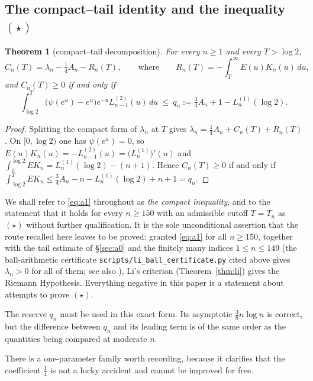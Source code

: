 \documentclass[11pt]{amsart}
\newtheorem{theorem}{Theorem}[section]
\theoremstyle{definition}
\theoremstyle{remark}
\theoremstyle{definition}
\begin{document}
\subsection{The compact--tail identity and the inequality $(\star)$}\label{sec:a1}

\begin{theorem}[compact--tail decomposition]\label{thm:compact-tail}
For every $n\ge1$ and every $T>\log 2$,
\begin{equation}\label{eq:CnT}
   C_n(T)=\lambda_n-\tfrac14A_n-R_n(T),
   \qquad\text{where}\qquad
   R_n(T)=-\int_T^\infty E(u)K_n(u)\,du ,
\end{equation}
and $C_n(T)\ge0$ if and only if
\begin{equation}\label{eq:a1}
   \tag{$\star$}
   \int_{\log2}^{T}\bigl(\psi(e^u)-e^u\bigr)e^{-u}L^{(2)}_{n-1}(u)\,du
   \ \le\ q_n:=\tfrac34A_n+1-L_n^{(1)}(\log2).
\end{equation}
\end{theorem}

\begin{proof}
Splitting the compact form of $\lambda_n$ at $T$ gives $\lambda_n=\tfrac14A_n+C_n(T)+R_n(T)$. On
$[0,\log2)$ one has $\psi(e^u)=0$, so $E(u)K_n(u)=-L^{(2)}_{n-1}(u)=\bigl(L^{(1)}_n\bigr)'(u)$ and
$\int_0^{\log2}EK_n=L^{(1)}_n(\log2)-(n+1)$. Hence $C_n(T)\ge0$ if and only if
$\int_{\log2}^TEK_n\le\tfrac34A_n-n-L^{(1)}_n(\log2)+n+1=q_n$.
\end{proof}

We shall refer to \eqref{eq:a1} throughout as \emph{the compact inequality}, and to the
statement that it holds for every $n\ge150$ with an admissible cutoff $T=T_n$ as $(\star)$
without further qualification. It is the sole unconditional assertion that the route recalled here
leaves to be proved: granted \eqref{eq:a1} for all $n\ge150$, together with the tail estimate of
\S\ref{sec:a0} and the finitely many indices $1\le n\le149$ (the ball-arithmetic certificate \texttt{scripts/li\_ball\_certificate.py} cited above gives
$\lambda_n>0$ for all of them; see also \cite{Maslanka}), Li's criterion (Theorem~\ref{thm:li}) gives the Riemann Hypothesis. Everything
negative in this paper is a statement about attempts to prove $(\star)$.

The reserve $q_n$ must be used in this exact form. Its asymptotic $\tfrac38n\log n$ is correct,
but the difference between $q_n$ and its leading term is of the same order as the quantities
being compared at moderate $n$.

There is a one-parameter family worth recording, because it clarifies that the coefficient
$\tfrac14$ is not a lucky accident and cannot be improved for free.
\end{document}

